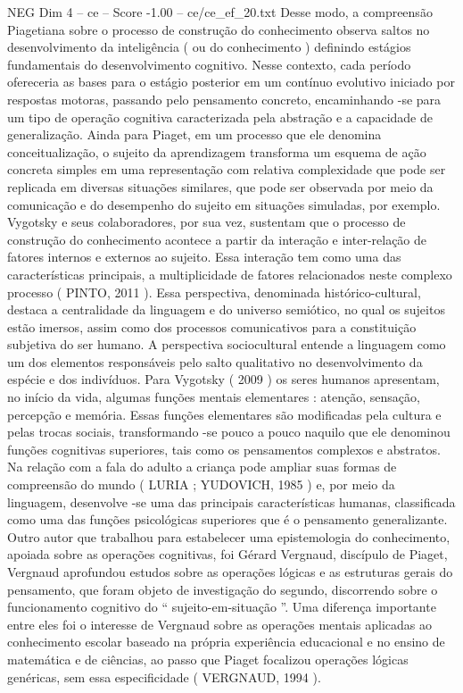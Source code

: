 \begin{textsample}{NEG Dim 4 – ce – Score -1.00 – ce/ce\_ef\_20.txt}
Desse modo, a compreensão Piagetiana sobre o processo de construção do conhecimento observa saltos no desenvolvimento da inteligência ( ou do conhecimento ) definindo estágios fundamentais do desenvolvimento cognitivo.
Nesse contexto, cada período ofereceria as bases para o estágio posterior em um contínuo evolutivo iniciado por respostas motoras, passando pelo pensamento concreto, encaminhando -se para um tipo de operação cognitiva caracterizada pela abstração e a capacidade de generalização.
Ainda para Piaget, em um processo que ele denomina conceitualização, o sujeito da aprendizagem transforma um esquema de ação concreta simples em uma representação com relativa complexidade que pode ser replicada em diversas situações similares, que pode ser observada por meio da comunicação e do desempenho do sujeito em situações simuladas, por exemplo.
Vygotsky e seus colaboradores, por sua vez, sustentam que o processo de construção do conhecimento acontece a partir da interação e inter-relação de fatores internos e externos ao sujeito.
Essa interação tem como uma das características principais, a multiplicidade de fatores relacionados neste complexo processo ( PINTO, 2011 ).
Essa perspectiva, denominada histórico-cultural, destaca a centralidade da linguagem e do universo semiótico, no qual os sujeitos estão imersos, assim como dos processos comunicativos para a constituição subjetiva do ser humano.
A perspectiva sociocultural entende a linguagem como um dos elementos responsáveis pelo salto qualitativo no desenvolvimento da espécie e dos indivíduos.
Para Vygotsky ( 2009 ) os seres humanos apresentam, no início da vida, algumas funções mentais elementares : atenção, sensação, percepção e memória.
Essas funções elementares são modificadas pela cultura e pelas trocas sociais, transformando -se pouco a pouco naquilo que ele denominou funções cognitivas superiores, tais como os pensamentos complexos e abstratos.
Na relação com a fala do adulto a criança pode ampliar suas formas de compreensão do mundo ( LURIA ; YUDOVICH, 1985 ) e, por meio da linguagem, desenvolve -se uma das principais características humanas, classificada como uma das funções psicológicas superiores que é o pensamento generalizante.
Outro autor que trabalhou para estabelecer uma epistemologia do conhecimento, apoiada sobre as operações cognitivas, foi Gérard Vergnaud, discípulo de Piaget, Vergnaud aprofundou estudos sobre as operações lógicas e as estruturas gerais do pensamento, que foram objeto de investigação do segundo, discorrendo sobre o funcionamento cognitivo do “ sujeito-em-situação ”.
Uma diferença importante entre eles foi o interesse de Vergnaud sobre as operações mentais aplicadas ao conhecimento escolar baseado na própria experiência educacional e no ensino de matemática e de ciências, ao passo que Piaget focalizou operações lógicas genéricas, sem essa especificidade ( VERGNAUD, 1994 ).

\end{textsample}
